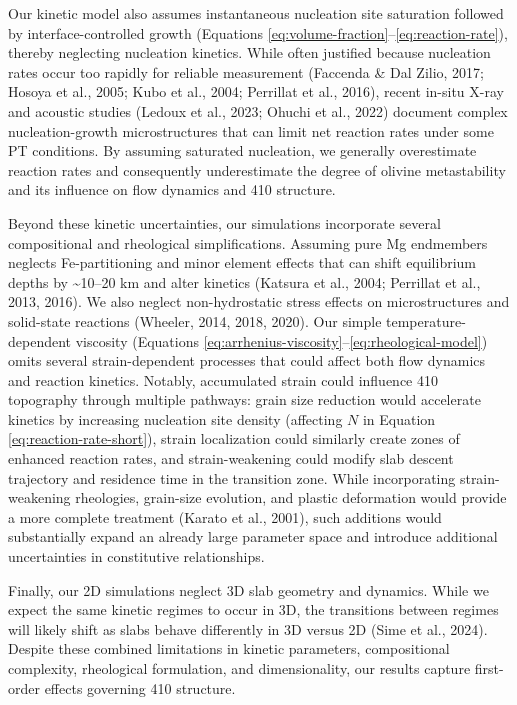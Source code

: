 \documentclass[draft,linenumbers]{agujournal2019}
\begin{document}
Our kinetic model also assumes instantaneous nucleation site saturation
followed by interface-controlled growth (Equations
\ref{eq:volume-fraction}--\ref{eq:reaction-rate}), thereby neglecting
nucleation kinetics. While often justified because nucleation rates
occur too rapidly for reliable measurement (Faccenda \& Dal Zilio, 2017;
Hosoya et al., 2005; Kubo et al., 2004; Perrillat et al., 2016), recent
in-situ X-ray and acoustic studies ({Ledoux et al.}, 2023; Ohuchi et
al., 2022) document complex nucleation-growth microstructures that can
limit net reaction rates under some PT conditions. By assuming saturated
nucleation, we generally overestimate reaction rates and consequently
underestimate the degree of olivine metastability and its influence on
flow dynamics and 410 structure.

Beyond these kinetic uncertainties, our simulations incorporate several
compositional and rheological simplifications. Assuming pure Mg
endmembers neglects Fe-partitioning and minor element effects that can
shift equilibrium depths by \textasciitilde10--20 km and alter kinetics
({Katsura et al.}, 2004; Perrillat et al., 2013, 2016). We also neglect
non-hydrostatic stress effects on microstructures and solid-state
reactions (Wheeler, 2014, 2018, 2020). Our simple temperature-dependent
viscosity (Equations
\ref{eq:arrhenius-viscosity}--\ref{eq:rheological-model}) omits several
strain-dependent processes that could affect both flow dynamics and
reaction kinetics. Notably, accumulated strain could influence 410
topography through multiple pathways: grain size reduction would
accelerate kinetics by increasing nucleation site density (affecting
\(N\) in Equation \ref{eq:reaction-rate-short}), strain localization
could similarly create zones of enhanced reaction rates, and
strain-weakening could modify slab descent trajectory and residence time
in the transition zone. While incorporating strain-weakening rheologies,
grain-size evolution, and plastic deformation would provide a more
complete treatment (Karato et al., 2001), such additions would
substantially expand an already large parameter space and introduce
additional uncertainties in constitutive relationships.

Finally, our 2D simulations neglect 3D slab geometry and dynamics. While
we expect the same kinetic regimes to occur in 3D, the transitions
between regimes will likely shift as slabs behave differently in 3D
versus 2D (Sime et al., 2024). Despite these combined limitations in
kinetic parameters, compositional complexity, rheological formulation,
and dimensionality, our results capture first-order effects governing
410 structure.
\end{document}
